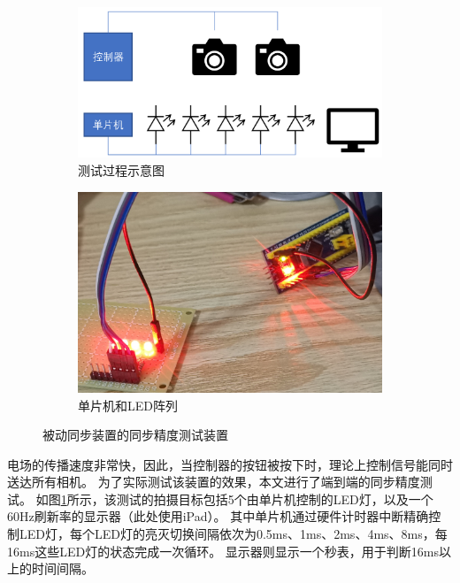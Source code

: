 \begin{figure}
\centering
\begin{subfigure}[b]{0.55\textwidth}
    \includegraphics[width=\textwidth]{figures/passive_sync_test}
    \caption{测试过程示意图}
\end{subfigure}%
\begin{subfigure}[b]{0.44\textwidth}
    \includegraphics[width=\textwidth]{figures/LED_array}
    \caption{单片机和LED阵列}
\end{subfigure}%
\caption{被动同步装置的同步精度测试装置}
\label{fig:passive_sync_test}
\end{figure}

电场的传播速度非常快，因此，当控制器的按钮被按下时，理论上控制信号能同时送达所有相机。
为了实际测试该装置的效果，本文进行了端到端的同步精度测试。
如图\ref{fig:passive_sync_test}所示，该测试的拍摄目标包括5个由单片机控制的LED灯，以及一个60Hz刷新率的显示器（此处使用iPad）。
其中单片机通过硬件计时器中断精确控制LED灯，每个LED灯的亮灭切换间隔依次为0.5ms、1ms、2ms、4ms、8ms，每16ms这些LED灯的状态完成一次循环。
显示器则显示一个秒表，用于判断16ms以上的时间间隔。

